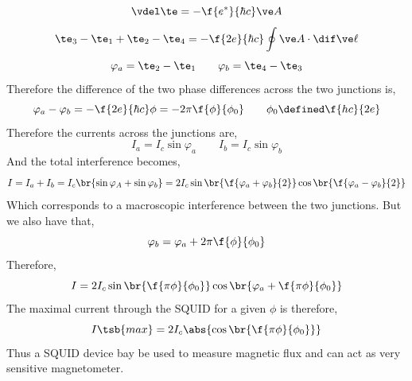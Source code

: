 \documentclass{article}
\newcommand{\vp}{\varphi}
\begin{document}
\[ \vdel \te = - \f{e^*}{\hbar c} \ve A \]
\[ \te_3 - \te_1 + \te_2 - \te_4 = -\f{2e}{\hbar c} \oint \ve A \cdot \dif \ve \ell \]
\[ \varphi_a = \te_2 - \te_1 \qquad \varphi_b = \te_4 - \te_3 \]
Therefore the difference of the two phase differences across the two junctions is,
\[ \varphi_a - \varphi_b = -\f{2e}{\hbar c}\phi = - 2\pi \f{\phi}{\phi_0} \qquad \phi_0 \defined \f{hc}{2e}\]
Therefore the currents across the junctions are,
\[ I_a = I_c \sin \varphi_a \qquad I_b = I_c \sin \varphi_b \]
And the total interference becomes,
\[ I = I_a + I_b = I_c \br{\sin \vp_A + \sin \vp_b} = 2 I_c \sin\br{\f{\vp_a + \vp_b}{2}}\cos\br{\f{\vp_a - \vp_b}{2}} \]
Which corresponds to a macroscopic interference between the two junctions. But we also have that,
\[ \vp_b = \vp_a + 2 \pi \f{\phi}{\phi_0} \]
Therefore,
\[ I = 2 I_c \sin\br{\f{\pi\phi}{\phi_0}}\cos\br{\vp_a + \f{\pi \phi}{\phi_0}} \]
The maximal current through the SQUID for a given $\phi$ is therefore,
\[ I\tsb{max} = 2 I_c \abs{\cos \br{\f{\pi \phi}{\phi_0}}} \]
Thus a SQUID device bay be used to measure magnetic flux and can act as very sensitive magnetometer.\\
\end{document}
